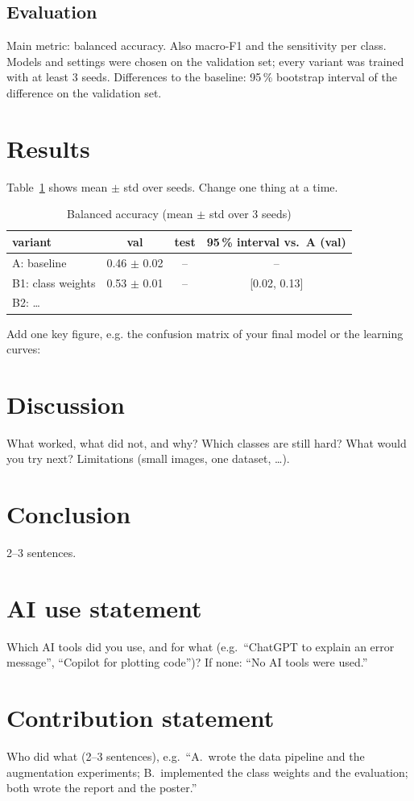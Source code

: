 \documentclass[conference]{IEEEtran}
\begin{document}
\subsection{Evaluation}
Main metric: balanced accuracy. Also macro-F1 and the sensitivity per class. Models and settings were chosen
on the validation set; every variant was trained with at least 3 seeds. Differences to the baseline:
95\,\% bootstrap interval of the difference on the validation set.

\section{Results}
Table~\ref{tab:results} shows mean $\pm$ std over seeds. Change one thing at a time.

\begin{table}[t]
\caption{Balanced accuracy (mean $\pm$ std over 3 seeds)}
\label{tab:results}
\centering
\begin{tabular}{lccc}
\toprule
variant & val & test & 95\,\% interval vs.\ A (val) \\
\midrule
A: baseline & 0.46 $\pm$ 0.02 & -- & -- \\
B1: class weights & 0.53 $\pm$ 0.01 & -- & [0.02, 0.13] \\
B2: \dots & & & \\
\bottomrule
\end{tabular}
\end{table}

Add one key figure, e.g. the confusion matrix of your final model or the learning curves:

\section{Discussion}
What worked, what did not, and why? Which classes are still hard? What would you try next?
Limitations (small images, one dataset, \dots).

\section{Conclusion}
2--3 sentences.

\section*{AI use statement}
Which AI tools did you use, and for what (e.g.\ ``ChatGPT to explain an error message'',
``Copilot for plotting code'')? If none: ``No AI tools were used.''

\section*{Contribution statement}
Who did what (2--3 sentences), e.g.\ ``A.\ wrote the data pipeline and the augmentation experiments;
B.\ implemented the class weights and the evaluation; both wrote the report and the poster.''



\end{document}
